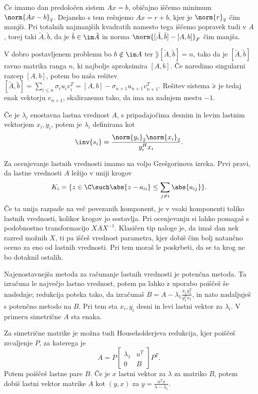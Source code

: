 
Če imamo dan predoločen sistem $A x = b$, običajno iščemo minimum $\norm{Ax -
  b}_2$.
Dejansko s tem rešujemo $Ax = r + b$, kjer je $\norm{r}_2$ čim manjši.
Pri totalnih najmanjših kvadratih namesto tega iščemo popravek tudi v $A$, torej
taki $\tilde{A}, \tilde{b}$, da je $\tilde{b} \in \im \tilde{A}$ in norma
$\norm{[\tilde{A}, \tilde{b}] - [A, b]}_F$ čim manjša.

V dobro postavljenem problemu bo $b \notin \im A$ ter $\rang [\tilde{A},
\tilde{b}] = n$, tako da je $[\tilde{A}, \tilde{b}]$ ravno matrika ranga $n$, ki
najbolje aproksimira $[A, b]$.
Če naredimo singularni razcep $[A,b]$, potem bo naša rešitev $[\tilde{A},
\tilde{b}] = \sum_{i \le n} \sigma_i u_i v_i^T = [A,b] - \sigma_{n+1} u_{n+1}
v_{n+1}^T$.
Rešitev sistema $\tilde{x}$ je tedaj enak vektorju $v_{n+1}$, skaliranemu tako,
da ima na zadnjem mestu $-1$.


Če je $\lambda_i$ enostavna lastna vrednost $A$, s pripadajočima desnim in levim
lastnim vektorjem $x_i, y_i$, potem je  $\lambda_i$
definirana kot
\[
  \inv{s_i} = \frac{\norm{y_i}_2 \norm{x_i}_2}{y_i^H x_i}.
\]

Za ocenjevanje lastnih vrednosti imamo na voljo Grešgorinova izreka.
Prvi pravi, da lastne vrednosti $A$ ležijo v uniji krogov
\[
  K_i = \{z \in \C \such \abs{z - a_{ii}} \le \sum_{j \ne i} \abs{a_{ij}}\}.
\]
Če ta unija razpade na več povezanih komponent, je v vsaki komponenti toliko
lastnih vrednosti, kolikor krogov jo sestavlja.
Pri ocenjevanju si lahko pomagaš s podobnostno transformacijo $X A X^{-1}$.
Klasičen tip naloge je, da imaš dan nek razred možnih $X$, ti pa iščeš
vrednost parametra, kjer dobiš čim bolj natančno oceno za eno od lastnih
vrednosti.
Pri tem moraš le poskrbeti, da se ta krog ne bo dotaknil ostalih.


Najenostavnejša metoda za računanje lastnih vrednosti je potenčna metoda.
Ta izračuna le največjo lastno vrednost, potem pa lahko z uporabo
 poiščeš še naslednje; redukcija poteka tako, da
izračunaš $B = A - \lambda_1 \frac{x_1 y_1^T}{y_1^T x_1}$, in nato nadaljuješ s
potenčno metodo na $B$.
Pri tem sta $x_i, y_i$ desni in levi lastni vektor za $\lambda_i$.
V primeru simetrične $A$ sta enaka.

Za simetrične matrike je možna tudi Householderjeva redukcija, kjer poiščeš
zrcaljenje $P$, za katerega je
\[
  A = P
  \begin{bmatrix}
	\lambda_1 & u^T \\
	0 & B
  \end{bmatrix}
  P^T.
\]
Potem poiščeš lastne pare $B$.
Če je $x$ lastni vektor za $\lambda$ za matriko $B$, potem dobiš lastni vektor
matrike $A$ kot $(y, x)$ za $y = \frac{u^T x}{\lambda - \lambda_1}$.

